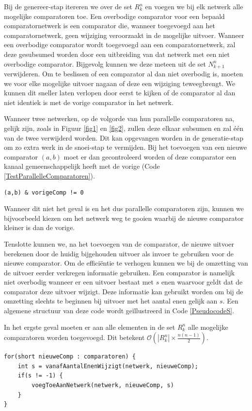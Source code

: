 \documentclass{article}
\begin{document}
Bij de genereer-stap itereren we over de set $R^n_k$ en voegen we bij elk netwerk alle mogelijke comparatoren toe.
Een overbodige comparator voor een bepaald comparatornetwerk is een comparator die, wanneer toegevoegd aan het comparatornetwerk, geen wijziging veroorzaakt in de mogelijke uitvoer.
Wanneer een overbodige comparator wordt toegevoegd aan een comparatornetwerk, zal deze gesubsumed worden door een uitbreiding van dat netwerk met een niet overbodige comparator.
Bijgevolg kunnen we deze meteen uit de set $N^n_{k+1}$ verwijderen. 
Om te beslissen of een comparator al dan niet overbodig is, moeten we voor elke mogelijke uitvoer nagaan of deze een wijziging teweegbrengt.
We kunnen dit sneller laten verlopen door eerst te kijken of de comparator al dan niet identiek is met de vorige comparator in het netwerk.

Wanneer twee netwerken, op de volgorde van hun parallelle comparatoren na, gelijk zijn, zoals in Figuur \ref{fig1} en \ref{fig2}, zullen deze elkaar subsumen en zal \'e\'en van de twee verwijderd worden.
Dit kan opgevangen worden in de generatie-stap om zo extra werk in de snoei-stap te vermijden.
Bij het toevoegen van een nieuwe comparator $(a,b)$ moet er dan gecontroleerd worden of deze comparator een kanaal gemeenschappelijk heeft met de vorige (Code \ref{TestParallelleComparatoren}).
\begin{lstlisting}[caption={Test op parallelle comparatoren.},label=TestParallelleComparatoren]
(a,b) & vorigeComp != 0
\end{lstlisting}
Wanneer dit niet het geval is en het dus parallelle comparatoren zijn, kunnen we bijvoorbeeld kiezen om het netwerk weg te gooien waarbij de nieuwe comparator kleiner is dan de vorige.

Tenslotte kunnen we, na het toevoegen van de comparator, de nieuwe uitvoer berekenen door de huidig bijgehouden uitvoer als invoer te gebruiken voor de nieuwe comparator.
Om de effici\"entie te verhogen kunnen we bij de omzetting van de uitvoer eerder verkregen informatie gebruiken.
Een comparator is namelijk niet overbodig wanneer er een uitvoer bestaat met $s$ enen waarvoor geldt dat de comparator deze uitvoer wijzigt.
Deze informatie kan gebruikt worden om bij de omzetting slechts te beginnen bij uitvoer met het aantal enen gelijk aan $s$.
Een algemene structuur van deze code wordt ge\"illustreerd in Code \ref{PseudocodeS}.

In het ergste geval moeten er aan alle elementen in de set $R^n_k$ alle mogelijke comparatoren worden toegevoegd.
Dit betekent $\mathcal{O}\left(|R^n_k|\times \frac{n(n-1)}{2} \right)$.
\begin{lstlisting}[caption={Pseudocode - optimalisatie via $s$}, label=PseudocodeS]
for(short nieuweComp : comparatoren) {
	int s = vanafAantalEnenWijzigt(netwerk, nieuweComp);
	if(s != -1) {
		voegToeAanNetwerk(netwerk, nieuweComp, s)
	}
}
\end{lstlisting}
\vspace{-6pt}
\end{document}
